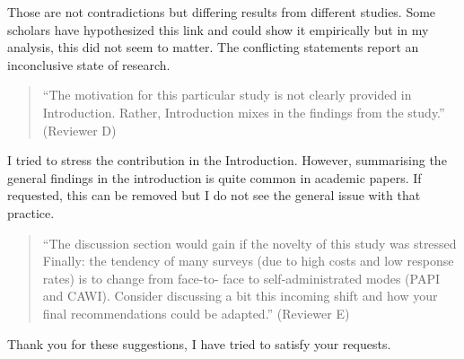\documentclass[a4paper, 12pt]{article}
\begin{document}
Those are not contradictions but differing results from different studies. Some scholars have hypothesized this link and could show it empirically but in my analysis, this did not seem to matter. The conflicting statements report an inconclusive state of research.

\begin{quotation}
``The motivation for this particular study is not clearly provided in Introduction. Rather, Introduction mixes in the findings from the study.'' (Reviewer D)
\end{quotation}

I tried to stress the contribution in the Introduction. However, summarising the general findings in the introduction is quite common in academic papers. If requested, this can be removed but I do not see the general issue with that practice.

\begin{quotation}
``The discussion section would gain if the novelty of this study was stressed
Finally: the tendency of many surveys (due to high costs and low response rates) is to change from face-to-
face to self-administrated modes (PAPI and CAWI). Consider discussing a bit this incoming shift and how your
final recommendations could be adapted.'' (Reviewer E)
\end{quotation}

Thank you for these suggestions, I have tried to satisfy your requests.
\end{document}
